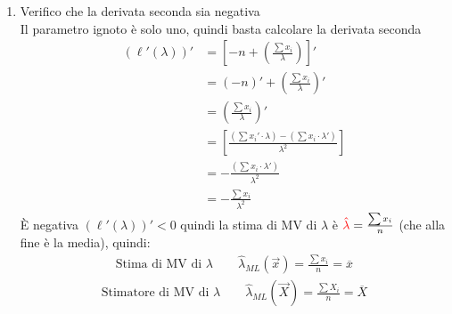 \documentclass{article}  %
\theoremstyle{definition}
\begin{document}
\begin{esempio}
\begin{enumerate}
\begin{align*}
		      \end{align*}
		\item Verifico che la derivata seconda sia negativa \\
		      Il parametro ignoto è solo uno, quindi basta calcolare la derivata seconda
		      \begin{align*}
			      (\ell'(\lambda))' & = \left[ -n + \left(\frac{\sum x_i}{\lambda}\right) \right]'                                                  \\
			                        & = (-n)' + \left(\frac{\sum x_i}{\lambda}\right)'                                                              \\
			                        & = \left(\frac{\sum x_i}{\lambda}\right)'                                                                      \\
			                        & = \left[\frac{\left(\sum x_i' \cdot \lambda\right) - \left(\sum x_i \cdot \lambda'\right)}{\lambda^2} \right] \\
			                        & = - \frac{\left(\sum x_i \cdot \lambda'\right)}{\lambda^2}                                                    \\
			                        & = - \frac{\sum x_i}{\lambda^2}
		      \end{align*}
		      È negativa $(\ell'(\lambda))' < 0$ quindi la stima di MV di $\lambda$ è $\textcolor{red}{\hat{\lambda}} = \frac{\sum x_i}{n}$ (che alla fine è la media), quindi:
		      \begin{align*}
			      \text{Stima di MV di $\lambda$} \quad \quad \hat{\lambda}_{ML}(\vec{x}) = \frac{\sum x_i}{n}=\overline{x}
		      \end{align*}
		      \begin{align*}
			      \text{Stimatore di MV di $\lambda$} \quad \quad \hat{\lambda}_{ML}(\vec{X}) = \frac{\sum X_i}{n}=\overline{X}
		      \end{align*}
	\end{enumerate}
\end{esempio}
\end{document}

